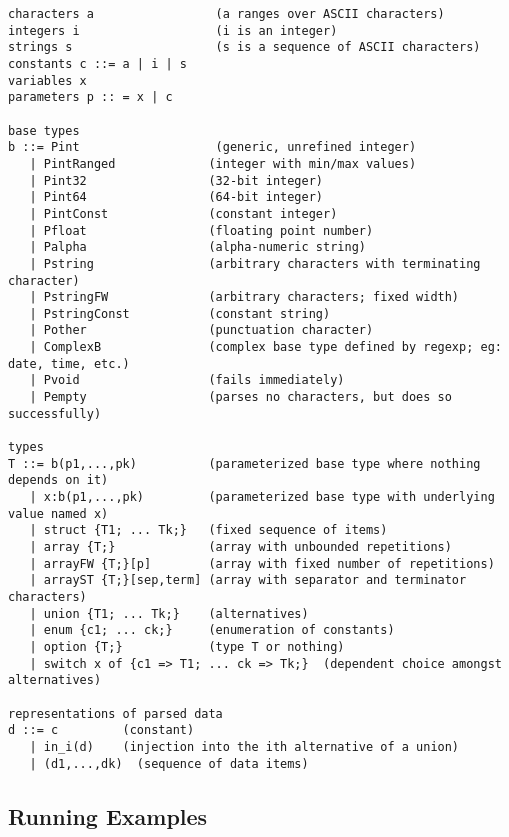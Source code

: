 \begin {figure*}
\begin {verbatim}
characters a                 (a ranges over ASCII characters)
integers i                   (i is an integer)
strings s                    (s is a sequence of ASCII characters)
constants c ::= a | i | s
variables x
parameters p :: = x | c

base types
b ::= Pint                   (generic, unrefined integer)
   | PintRanged             (integer with min/max values)
   | Pint32                 (32-bit integer)
   | Pint64                 (64-bit integer)
   | PintConst              (constant integer)
   | Pfloat                 (floating point number)
   | Palpha                 (alpha-numeric string)
   | Pstring                (arbitrary characters with terminating character)
   | PstringFW              (arbitrary characters; fixed width)
   | PstringConst           (constant string)
   | Pother                 (punctuation character)
   | ComplexB               (complex base type defined by regexp; eg: date, time, etc.)
   | Pvoid                  (fails immediately)
   | Pempty                 (parses no characters, but does so successfully)

types
T ::= b(p1,...,pk)          (parameterized base type where nothing depends on it)
   | x:b(p1,...,pk)         (parameterized base type with underlying value named x)     
   | struct {T1; ... Tk;}   (fixed sequence of items)
   | array {T;}             (array with unbounded repetitions)
   | arrayFW {T;}[p]        (array with fixed number of repetitions) 
   | arrayST {T;}[sep,term] (array with separator and terminator characters)
   | union {T1; ... Tk;}    (alternatives)
   | enum {c1; ... ck;}     (enumeration of constants)
   | option {T;}            (type T or nothing)
   | switch x of {c1 => T1; ... ck => Tk;}  (dependent choice amongst alternatives)

representations of parsed data
d ::= c         (constant)
   | in_i(d)    (injection into the ith alternative of a union)
   | (d1,...,dk)  (sequence of data items)

\end{verbatim}
\caption {Selected elements of the \ir{}.  Note: formatting needed.}
\label{fig:ir}
\end{figure*}

\subsection{Running Examples}

